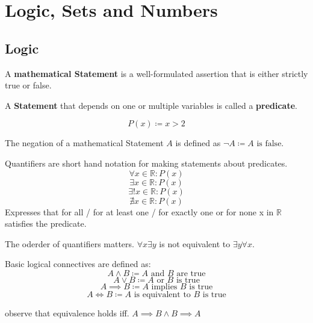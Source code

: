 \section{Logic, Sets and Numbers}

\subsection{Logic}

\begin{definition}
A \textbf{mathematical Statement} is a well-formulated assertion that is either strictly true or false.
\end{definition}

\begin{definition}
A \textbf{Statement} that depends on one or multiple variables is called a \textbf{predicate}.
\end{definition}

\begin{example}
$$P(x) \coloneqq x > 2$$
\end{example}

\begin{definition}
The negation of a mathematical Statement $A$ is defined as $\neg A \coloneqq A \text{ is false}$.
\end{definition}

\begin{definition}
Quantifiers are short hand notation for making statements about predicates.
$$\forall x \in \mathbb{R}: P(x)$$
$$\exists x \in \mathbb{R}: P(x)$$
$$\exists ! x \in \mathbb{R}: P(x)$$
$$\nexists x \in \mathbb{R}: P(x)$$
Expresses that for all / for at least one / for exactly one or for none x in $\mathbb{R}$ satisfies the predicate.
\end{definition}

\begin{important}
The oderder of quantifiers matters. $\forall x \exists y$ is not equivalent to $\exists y \forall x$.
\end{important}

\begin{definition}
Basic logical connectives are defined as:
$$A \land B \coloneqq A \text{ and } B \text{ are true}$$
$$A \lor B \coloneqq A \text{ or } B \text{ is true}$$
$$A \implies B \coloneqq A \text{ implies } B \text{ is true}$$
$$A \iff B \coloneqq A \text{ is equivalent to } B \text{ is true}$$

observe that equivalence holds iff. $A \implies B \land B \implies A$
\end{definition}

